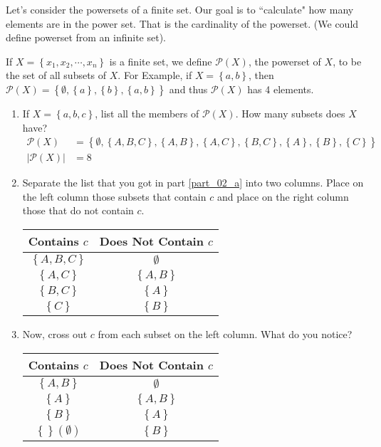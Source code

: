 \documentclass{article}
\begin{document}
Let's consider the powersets of a finite set. Our goal is to ``calculate" how many elements are in the power set. That is the cardinality of the powerset. (We could define powerset from an infinite set).

If $ X = \left\{ x_1, x_2, \cdots, x_n \right\} $ is a finite set, we define $ \mathcal{P}(X) $, the powerset of $ X $, to be the set of all subsets of $ X $. For Example, if $ X = \left\{ a, b \right\} $, then $ \mathcal{P}(X) = \left\{ \emptyset, \left\{ a \right\}, \left\{ b \right\}, \left\{ a, b \right\} \right\} $ and thus $ \mathcal{P}(X) $ has 4 elements.

\begin{enumerate}[label = \textbf{\alph*)}]
	\item \label{part_02_a} If $ X = \left\{ a, b, c \right\} $, list all the members of $ \mathcal{P}(X) $. How many subsets does $ X $ have?
		\begin{align*}
			\mathcal{P}(X) & = \left\{ \emptyset, \left\{ A, B, C \right\}, \left\{ A, B \right\}, \left\{ A, C \right\}, \left\{ B, C \right\}, \left\{ A \right\}, \left\{ B \right\}, \left\{ C \right\} \right\} \\
			|\mathcal{P}(X)| & = 8
		\end{align*}
	\item \label{part_02_b} Separate the list that you got in part \ref{part_02_a} into two columns. Place on the left column those subsets that contain $ c $ and place on the right column those that do not contain $ c $. \\
		\begin{tabular}{ | c | c | }
			Contains $ c $ & Does Not Contain $ c $ \\
			\hline
			$ \left\{ A, B, C \right\} $ & $ \emptyset $ \\
			$ \left\{ A, C \right\} $ & $ \left\{ A, B \right\} $ \\
			$ \left\{ B, C \right\} $ & $ \left\{ A \right\} $ \\
			$ \left\{ C \right\} $ & $ \left\{ B \right\} $
		\end{tabular}
	\item \label{part_02_c} Now, cross out $ c $ from each subset on the left column. What do you notice? \\
		\begin{tabular}{ | c | c | }
			Contains $ c $ & Does Not Contain $ c $ \\
			\hline
			$ \left\{ A, B \right\} $ & $ \emptyset $ \\
			$ \left\{ A \right\} $ & $ \left\{ A, B \right\} $ \\
			$ \left\{ B \right\} $ & $ \left\{ A \right\} $ \\
			$ \left\{ \right\} \left( \emptyset \right) $ & $ \left\{ B \right\} $
		\end{tabular}


\end{enumerate}
\end{document}
